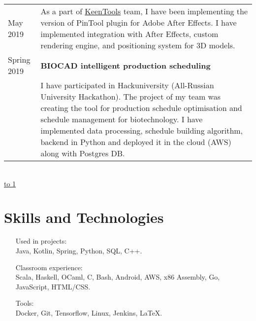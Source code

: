 \documentclass[10pt]{article}
\def\LINE{\vspace*{-1em}\noindent \underline{\hbox to 1\textwidth{{ } \hfil{ } \hfil{ } }}}
\begin{document}
\begin{tabular}{p{2.5cm}|p{14.7cm}}
  May 2019 & \footnotesize{As a part of \href{https://www.keentools.io/}{KeenTools} team, I have been implementing the version of PinTool plugin for Adobe After Effects. I have implemented integration with After Effects, custom rendering engine, and positioning system for 3D models.} \\
  Spring 2019 & \textbf{BIOCAD intelligent production scheduling} \\
  & \footnotesize{I have participated in Hackuniversity (All-Russian University Hackathon). The project of my team was creating the tool for production schedule optimisation and schedule management for biotechnology. I have implemented data processing, schedule building algorithm, backend in Python and deployed it in the cloud (AWS) along with Postgres DB.}  
\end{tabular}
\\
\LINE
\section*{\color{accent} Skills and Technologies}
\begin{itemize}[font=\bfseries,  wide=1.5em,  leftmargin=*]
  \item[Used in projects:] \  \\ Java, Kotlin, Spring, Python, SQL, C++.
  \item[Classroom experience:] \ \\ Scala, Haskell, OCaml, C, Bash, Android, AWS, x86 Assembly, Go, JavaScript, HTML/CSS.
  \item[Tools:] \ \\ Docker, Git, Tensorflow, Linux, Jenkins, \LaTeX.
\end{itemize}
\end{document}
